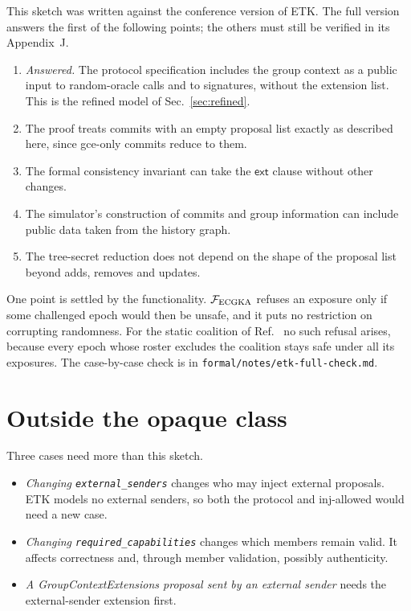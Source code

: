 \documentclass[aps,prx,reprint,superscriptaddress,nofootinbib,floatfix]{revtex4-2}
\theoremstyle{remark}
\newcommand{\gce}{\textsf{gce}}
\newcommand{\ext}{\mathsf{ext}}
\newcommand{\F}{\mathcal F_{\rm ECGKA}}
\begin{document}
This sketch was written against the conference version of ETK. The full version~\cite{etk} answers the first of the following points; the others must still be verified in its Appendix~J.
\begin{enumerate}
\item \emph{Answered.} The protocol specification includes the group context as a public input to random-oracle calls and to signatures, without the extension list. This is the refined model of Sec.~\ref{sec:refined}.
\item The proof treats commits with an empty proposal list exactly as described here, since \gce-only commits reduce to them.
\item The formal consistency invariant can take the $\ext$ clause without other changes.
\item The simulator's construction of commits and group information can include public data taken from the history graph.
\item The tree-secret reduction does not depend on the shape of the proposal list beyond adds, removes and updates.
\end{enumerate}
One point is settled by the functionality. $\F$ refuses an exposure only if some challenged epoch would then be unsafe, and it puts no restriction on corrupting randomness. For the static coalition of Ref.~\cite{concordance} no such refusal arises, because every epoch whose roster excludes the coalition stays safe under all its exposures. The case-by-case check is in \texttt{formal/notes/etk-full-check.md}.

\section{Outside the opaque class}

Three cases need more than this sketch.
\begin{itemize}
\item \emph{Changing \texttt{external\_senders}} changes who may inject external proposals. ETK models no external senders, so both the protocol and \textsf{inj-allowed} would need a new case.
\item \emph{Changing \texttt{required\_capabilities}} changes which members remain valid. It affects correctness and, through member validation, possibly authenticity.
\item \emph{A GroupContextExtensions proposal sent by an external sender} needs the external-sender extension first.
\end{itemize}
\end{document}
